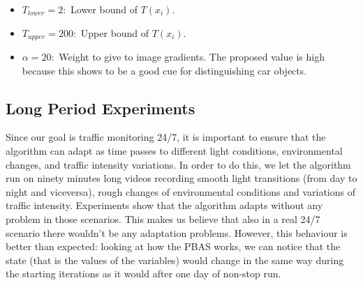 \begin{itemize}
\item $T_{lower}= 2:$ Lower bound of $T(x_i)$.
\item $T_{upper}= 200:$ Upper bound of $T(x_i)$.
\item $\alpha = 20:$ Weight to give to image gradients. The proposed value is high because this shows to be a good cue for distinguishing car objects.
\end{itemize} 

\subsection{Long Period Experiments}
Since our goal is traffic monitoring 24/7, it is important to ensure that the algorithm can adapt as time passes to different light conditions, environmental changes, and traffic intensity variations. In order to do this, we let the algorithm run on ninety minutes long videos recording smooth light transitions (from day to night and viceversa), rough changes of environmental conditions and variations of traffic intensity. Experiments show that the algorithm adapts without any problem in those scenarios. This makes us believe that also in a real 24/7 scenario there wouldn't be any adaptation problems. However, this behaviour is better than expected: looking at how the PBAS works, we can notice that the state (that is the values of the variables) would change in the same way during the starting iterations as it would after one day of non-stop run.

